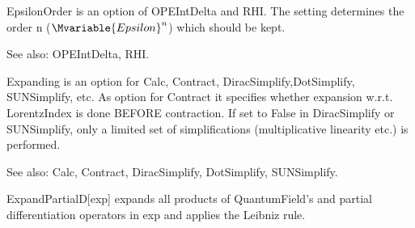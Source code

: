 EpsilonOrder is an option of OPEIntDelta and RHI. The setting determines the order n (\({{\Mvariable{Epsilon}}^n}\)) which should be kept.

See also:  OPEIntDelta, RHI.



Expanding is an option for Calc, Contract, DiracSimplify,DotSimplify, SUNSimplify, etc. As option for Contract it specifies whether
  expansion w.r.t. LorentzIndex is done BEFORE contraction. If set to False in DiracSimplify or SUNSimplify, only a limited set of
  simplifications (multiplicative linearity etc.) is performed.

See also:  Calc, Contract, DiracSimplify, DotSimplify, SUNSimplify.



ExpandPartialD[exp] expands all products of QuantumField's and partial differentiation operators in exp and applies the Leibniz rule.


